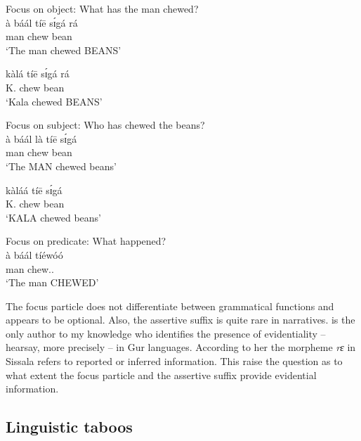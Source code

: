 \begin{exe}
\begin{exe}
\begin{exe}
{\begin{exe}
\begin{exe}
\begin{exe}
\begin{exe}
\begin{exe}
\begin{exe}
\begin{exe}
\begin{xlist}
\begin{exe}
\begin{exe}
\begin{exe}
\begin{exe}
\begin{exe}
\begin{exe}
\begin{exe}
\begin{exe}
\begin{exe}
\begin{exe}
\begin{exe}
\begin{exe}
\begin{exe}
\begin{exe}
\begin{exe}
 \ea\label{ex:GRM-focus-obj}{\rm Focus on object: What has the man chewed?}\\
\gll   à báál tíē sɪ́gá rá\\
      {\art} man chew bean {\foc} \\
\glt `The man chewed BEANS'

\gll  kàlá tíē sɪ́gá rá\\
      K.   chew bean {\foc}\\
\glt `Kala chewed BEANS'

\ex\label{ex:GRM-focus-subj}{\rm Focus on subject: Who has chewed the beans?}\\
\gll   à báál là  tíē sɪ́gá   \\
       {\art} man {\foc} chew bean    \\
\glt `The MAN chewed beans'



\gll  kàláá tíē sɪ́gá\\
      K.   chew bean\\
\glt `KALA chewed beans'

\ex\label{ex:GRM-focus-pred}{\rm Focus on predicate: What happened?}\\
\gll    à báál tíéwóó  \\
   {\art} man chew.{\pfv .\foc}    \\
\glt `The man CHEWED'


\z 
 \z

The focus particle does not differentiate between  grammatical functions and 
appears to be optional.  Also,  the assertive suffix is quite rare 
in narratives.  \citet[94]{blas90} is the only author to my knowledge 
who identifies the presence  of  evidentiality --  hearsay, more precisely -- 
in Gur languages. According to her the morpheme {\it rɛ} in Sissala refers to 
reported or inferred information. This raise the question as to what extent the 
focus particle and the assertive suffix provide evidential information. 



\subsection{Linguistic taboos}
\label{sec:GRM-ling-taboo}


\end{exe}
\end{exe}
\end{exe}
\end{exe}
\end{exe}
\end{exe}
\end{exe}
\end{exe}
\end{exe}
\end{exe}
\end{exe}
\end{exe}
\end{exe}
\end{exe}
\end{exe}
\end{xlist}
\end{exe}
\end{exe}
\end{exe}
\end{exe}
\end{exe}
\end{exe}
\end{exe}}
\end{exe}
\end{exe}
\end{exe}
